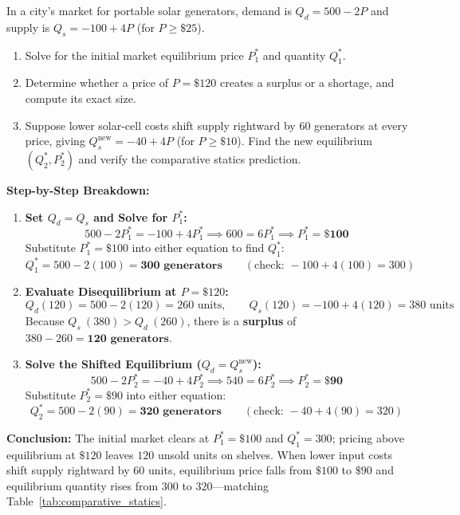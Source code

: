 \documentclass[11pt,letterpaper]{article}
\begin{document}
\begin{tcolorbox}[colback=CourseTeal!6!white,colframe=CourseTeal,title=\textbf{Work It Out: Market Equilibrium, Disequilibrium, and Comparative Statics}]
In a city's market for portable solar generators, demand is $Q_d = 500 - 2P$ and supply is $Q_s = -100 + 4P$ (for $P \ge \$25$).
\begin{enumerate}
    \item Solve for the initial market equilibrium price $P_1^*$ and quantity $Q_1^*$.
    \item Determine whether a price of $P = \$120$ creates a surplus or a shortage, and compute its exact size.
    \item Suppose lower solar-cell costs shift supply rightward by $60$ generators at every price, giving $Q_s^{\text{new}} = -40 + 4P$ (for $P \ge \$10$). Find the new equilibrium $(Q_2^*, P_2^*)$ and verify the comparative statics prediction.
\end{enumerate}

\noindent\textbf{Step-by-Step Breakdown:}
\begin{enumerate}
    \item \textbf{Set $Q_d = Q_s$ and Solve for $P_1^*$:}
    \[
    500 - 2P_1^* = -100 + 4P_1^* \implies 600 = 6P_1^* \implies P_1^* = \mathbf{\$100}
    \]
    Substitute $P_1^* = \$100$ into either equation to find $Q_1^*$:
    \[
    Q_1^* = 500 - 2(100) = \mathbf{300\text{ generators}} \qquad (\text{check: } -100 + 4(100) = 300)
    \]

    \item \textbf{Evaluate Disequilibrium at $P = \$120$:}
    \[
    Q_d(120) = 500 - 2(120) = 260\text{ units}, \qquad Q_s(120) = -100 + 4(120) = 380\text{ units}
    \]
    Because $Q_s\ (380) > Q_d\ (260)$, there is a \textbf{surplus} of $380 - 260 = \mathbf{120\text{ generators}}$.

    \item \textbf{Solve the Shifted Equilibrium ($Q_d = Q_s^{\text{new}}$):}
    \[
    500 - 2P_2^* = -40 + 4P_2^* \implies 540 = 6P_2^* \implies P_2^* = \mathbf{\$90}
    \]
    Substitute $P_2^* = \$90$ into either equation:
    \[
    Q_2^* = 500 - 2(90) = \mathbf{320\text{ generators}} \qquad (\text{check: } -40 + 4(90) = 320)
    \]
\end{enumerate}
\textbf{Conclusion:} The initial market clears at $P_1^* = \$100$ and $Q_1^* = 300$; pricing above equilibrium at $\$120$ leaves $120$ unsold units on shelves. When lower input costs shift supply rightward by $60$ units, equilibrium price falls from $\$100$ to $\$90$ and equilibrium quantity rises from $300$ to $320$—matching Table~\ref{tab:comparative_statics}.
\end{tcolorbox}
\end{document}
